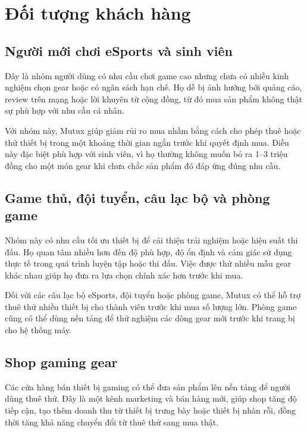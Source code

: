 \section{Đối tượng khách hàng}

\subsection{Người mới chơi eSports và sinh viên}

Đây là nhóm người dùng có nhu cầu chơi game cao nhưng chưa có nhiều kinh nghiệm chọn gear hoặc có ngân sách hạn chế. Họ dễ bị ảnh hưởng bởi quảng cáo, review trên mạng hoặc lời khuyên từ cộng đồng, từ đó mua sản phẩm không thật sự phù hợp với nhu cầu cá nhân.

Với nhóm này, Mutux giúp giảm rủi ro mua nhầm bằng cách cho phép thuê hoặc thử thiết bị trong một khoảng thời gian ngắn trước khi quyết định mua. Điều này đặc biệt phù hợp với sinh viên, vì họ thường không muốn bỏ ra 1--3 triệu đồng cho một món gear khi chưa chắc sản phẩm đó đáp ứng đúng nhu cầu.

\subsection{Game thủ, đội tuyển, câu lạc bộ và phòng game}

Nhóm này có nhu cầu tối ưu thiết bị để cải thiện trải nghiệm hoặc hiệu suất thi đấu. Họ quan tâm nhiều hơn đến độ phù hợp, độ ổn định và cảm giác sử dụng thực tế trong quá trình luyện tập hoặc thi đấu. Việc được thử nhiều mẫu gear khác nhau giúp họ đưa ra lựa chọn chính xác hơn trước khi mua.

Đối với các câu lạc bộ eSports, đội tuyển hoặc phòng game, Mutux có thể hỗ trợ thuê thử nhiều thiết bị cho thành viên trước khi mua số lượng lớn. Phòng game cũng có thể dùng nền tảng để thử nghiệm các dòng gear mới trước khi trang bị cho hệ thống máy.

\subsection{Shop gaming gear}

Các cửa hàng bán thiết bị gaming có thể đưa sản phẩm lên nền tảng để người dùng thuê thử. Đây là một kênh marketing và bán hàng mới, giúp shop tăng độ tiếp cận, tạo thêm doanh thu từ thiết bị trưng bày hoặc thiết bị nhàn rỗi, đồng thời tăng khả năng chuyển đổi từ thuê thử sang mua thật.
